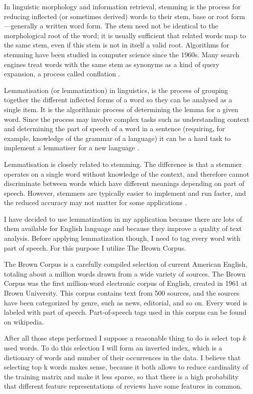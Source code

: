 \documentclass[12pt]{report}
\begin{document}
In linguistic morphology and information retrieval, stemming is the process for reducing inflected (or sometimes derived) words to their stem, base or root form—generally a written word form. The stem need not be identical to the morphological root of the word; it is usually sufficient that related words map to the same stem, even if this stem is not in itself a valid root. Algorithms for stemming have been studied in computer science since the 1960s. Many search engines treat words with the same stem as synonyms as a kind of query expansion, a process called conflation \cite{Wake}.

Lemmatisation (or lemmatization) in linguistics, is the process of grouping together the different inflected forms of a word so they can be analysed as a single item. 
It is the algorithmic process of determining the lemma for a given word. Since the process may involve complex tasks such as understanding context and determining the part of speech of a word in a sentence (requiring, for example, knowledge of the grammar of a language) it can be a hard task to implement a lemmatiser for a new language \cite{Wake}.

Lemmatisation is closely related to stemming. The difference is that a stemmer operates on a single word without knowledge of the context, and therefore cannot discriminate between words which have different meanings depending on part of speech. However, stemmers are typically easier to implement and run faster, and the reduced accuracy may not matter for some applications \cite{potts}.

I have decided to use lemmatization in my application because there are lots of them available for English language and because they improve a quality of text analysis. Before applying lemmatization though, I need to tag every word with part of speech. For this purpose I utilize The Brown Corpus.

The Brown Corpus is a carefully compiled selection of current American English, totaling about a million words drawn from a wide variety of sources. The Brown Corpus was the first million-word electronic corpus of English, created in 1961 at Brown University. This corpus contains text from 500 sources, and the sources have been categorized by genre, such as news, editorial, and so on. Every word is labeled with part of speech. Part-of-speech tags used in this corpus can be found on wikipedia.

After all those steps performed I suppose a reasonable thing to do is select top $k$ used words. To do this selection I will form an inverted index, which is a dictionary of words and number of their occurrences in the data. I believe that selecting top k words makes sense, because it both allows to reduce cardinality of the training matrix and make it less sparse, so that there is a high probability that different feature representations of reviews have some features in common.
\end{document}
